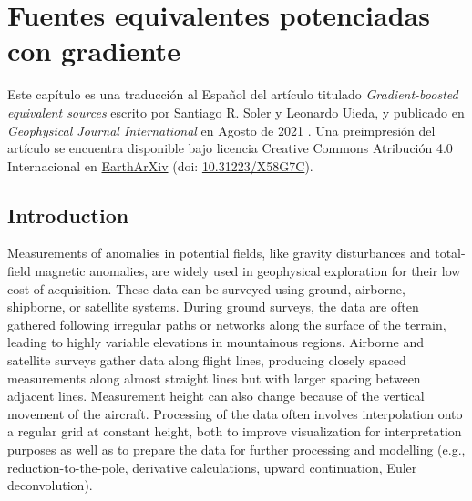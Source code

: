 \chapter[Fuentes equivalentes potenciadas con gradiente]{
    Fuentes equivalentes potenciadas con gradiente
}
\label{cha:eql-gradient-boosted}

Este capítulo es una traducción al Español del artículo titulado
\emph{Gradient-boosted equivalent sources} escrito por Santiago R. Soler
y Leonardo Uieda, y publicado en \emph{Geophysical Journal
International} en Agosto de 2021 \citep{soler2021}.
Una preimpresión del artículo se encuentra disponible bajo licencia Creative
Commons Atribución 4.0 Internacional en
\href{https://eartharxiv.org/}{EarthArXiv} (doi:
\href{https://doi.org/10.31223/X58G7C}{10.31223/X58G7C}).












\section{Introduction}

Measurements of anomalies in potential fields, like gravity disturbances and
total-field magnetic anomalies, are widely used in geophysical exploration for
their low cost of acquisition.
These data can be surveyed using ground, airborne, shipborne, or satellite
systems.
During ground surveys, the data are often gathered following irregular paths or
networks along the surface of the terrain, leading to highly variable
elevations in mountainous regions.
Airborne and satellite surveys gather data along flight lines, producing
closely spaced measurements along almost straight lines but with larger spacing
between adjacent lines.
Measurement height can also change because of the vertical movement of the
aircraft.
Processing of the data often involves interpolation onto a regular grid at
constant height, both to improve visualization for interpretation purposes as
well as to prepare the data for further processing and modelling (e.g.,
reduction-to-the-pole, derivative calculations, upward continuation, Euler
deconvolution).

